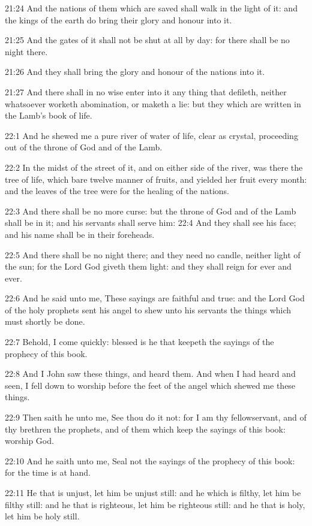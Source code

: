 21:24 And the nations of them which are saved shall walk in the light
of it: and the kings of the earth do bring their glory and honour into
it.

21:25 And the gates of it shall not be shut at all by day: for there
shall be no night there.

21:26 And they shall bring the glory and honour of the nations into
it.

21:27 And there shall in no wise enter into it any thing that
defileth, neither whatsoever worketh abomination, or maketh a lie: but
they which are written in the Lamb's book of life.

22:1 And he shewed me a pure river of water of life, clear as crystal,
proceeding out of the throne of God and of the Lamb.

22:2 In the midst of the street of it, and on either side of the
river, was there the tree of life, which bare twelve manner of fruits,
and yielded her fruit every month: and the leaves of the tree were for
the healing of the nations.

22:3 And there shall be no more curse: but the throne of God and of
the Lamb shall be in it; and his servants shall serve him: 22:4 And
they shall see his face; and his name shall be in their foreheads.

22:5 And there shall be no night there; and they need no candle,
neither light of the sun; for the Lord God giveth them light: and they
shall reign for ever and ever.

22:6 And he said unto me, These sayings are faithful and true: and the
Lord God of the holy prophets sent his angel to shew unto his servants
the things which must shortly be done.

22:7 Behold, I come quickly: blessed is he that keepeth the sayings of
the prophecy of this book.

22:8 And I John saw these things, and heard them. And when I had heard
and seen, I fell down to worship before the feet of the angel which
shewed me these things.

22:9 Then saith he unto me, See thou do it not: for I am thy
fellowservant, and of thy brethren the prophets, and of them which
keep the sayings of this book: worship God.

22:10 And he saith unto me, Seal not the sayings of the prophecy of
this book: for the time is at hand.

22:11 He that is unjust, let him be unjust still: and he which is
filthy, let him be filthy still: and he that is righteous, let him be
righteous still: and he that is holy, let him be holy still.

